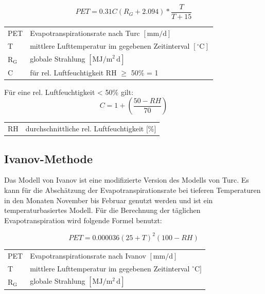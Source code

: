 \begin{equation}
\label{eq:turc}
PET=0.31C\left(R_G+2.094\right)*\frac{T}{T+15}
\end{equation}
\begin{table}[H]
\centering
\begin{tabular}{ll}
PET & Evapotranspirationsrate nach Turc  $\mathrm{[mm/d]}$\\
T & mittlere Lufttemperatur im gegebenen Zeitinterval $\mathrm{[^{\circ}C]}$\\
$\mathrm{R_G}$ & globale Strahlung $\mathrm{[MJ/m^2\,d]}$\\
C & für rel. Luftfeuchtigkeit RH $\geq$ 50\% = 1\\
\end{tabular}
\end{table}
Für eine rel. Luftfeuchtigkeit < 50\% gilt:
\begin{equation}
\label{eq:turc_c}
C=1+\left(\frac{50-RH}{70}\right)
\end{equation}
\begin{table}[H]
\centering
\begin{tabular}{ll}
RH& durchschnittliche rel. Luftfeuchtigkeit [\%]\\
\end{tabular}
\end{table}

\subsection{Ivanov-Methode}
Das Modell von Ivanov ist eine modifizierte Version des Modells von Turc. Es kann für die Abschätzung der Evapotranspirationsrate bei tieferen Temperaturen in den Monaten November bis Februar genutzt werden und ist ein temperaturbasiertes Modell. Für die Berechnung der täglichen Evapotranspiration wird folgende Formel benutzt:

\begin{equation}
\label{eq:ivanov_d}
PET=0.000036(25+T)^2(100-RH)
\end{equation}
\begin{table}[H]
\centering
\begin{tabular}{ll}
PET & Evapotranspirationsrate nach Ivanov  $\mathrm{[mm/d]}$\\
T & mittlere Lufttemperatur im gegebenen Zeitinterval $\mathrm{{^\circ}C]}$\\
$\mathrm{R_G}$ & globale Strahlung $\mathrm{[MJ/m^2\,d]}$\\
\end{tabular}
\end{table}

